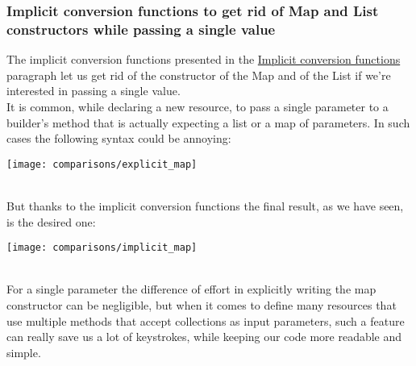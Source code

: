 \subsubsection{Implicit conversion functions to get rid of Map and List constructors while passing a single value}
The implicit conversion functions presented in the \hyperref[sssec:implicit-converion-functions]{Implicit conversion functions} paragraph let us get rid of the constructor of the Map and of the List if we're interested in passing a single value.\\
It is common, while declaring a new resource, to pass a single parameter to a builder's method that is actually expecting a list or a map of parameters.
In such cases the following syntax could be annoying:
\begin{center}
  \texttt{[image: comparisons/explicit\_map]} 
\end{center}\mbox{}\\
But thanks to the implicit conversion functions the final result, as we have seen, is the desired one:
\begin{center}
  \texttt{[image: comparisons/implicit\_map]} 
\end{center}\mbox{}\\
For a single parameter the difference of effort in explicitly writing the map constructor can be negligible, but when it comes to define many resources that use multiple methods that accept collections as input parameters, such a feature can really save us a lot of keystrokes, while keeping our code more readable and simple.

